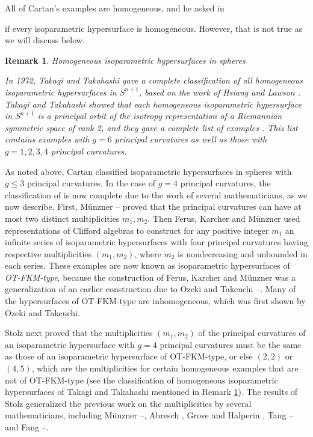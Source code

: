 \documentclass[12pt]{article}
\newtheorem{remark}{Remark}[section]
\begin{document}
All of Cartan's examples are homogeneous, and he asked in {\cite{Car3} if every isoparametric hypersurface
is homogeneous.  However,
that is not true as we will discuss below.

\begin{remark}{Homogeneous isoparametric hypersurfaces in spheres}
\label{rem-Takagi-Takahashi}

\noindent
{\rm In 1972, Takagi and Takahashi \cite{TT} gave a complete classification of all homogeneous
isoparametric hypersurfaces
in $S^{n+1}$, based on the work of Hsiang and Lawson \cite{HL}.  Takagi and Takahashi showed that each homogeneous
isoparametric hypersurface in $S^{n+1}$ is a principal orbit of the isotropy representation
of a Riemannian symmetric space of 
rank 2, and they gave a complete list of examples \cite[p. 480]{TT}.  This list contains examples with $g=6$
principal curvatures as well as those with $g=1,2,3,4$ principal curvatures. }
\end{remark} 

As noted above, Cartan classified isoparametric hypersurfaces in spheres with $g \leq 3$ principal curvatures.
In the case of $g=4$ principal curvatures, the classification of
is now complete due to the work of several 
mathematicians, as we now describe.  First,
M\"{u}nzner  \cite{Mu}--\cite{Mu2}  proved that
the principal curvatures can have at most two
distinct multiplicities $m_1,m_2$. 
Then Ferus, Karcher and M\"{u}nzner
\cite{FKM} 
used representations
of Clifford algebras to construct
for any positive integer
$m_1$ an infinite series of isoparametric hypersurfaces
with four principal curvatures having respective multiplicities
$(m_1,m_2)$, where $m_2$ is nondecreasing and
unbounded in each series. 
These examples are now known as isoparametric hypersurfaces of {\it OT-FKM-type}, because
the construction of Ferus, Karcher and M\"{u}nzner was a generalization of an earlier construction due to Ozeki and Takeuchi \cite{OT}--\cite{OT2}.  Many of the hypersurfaces of  OT-FKM-type are inhomogeneous, 
which was first shown by Ozeki and Takeuchi.

  
Stolz \cite{Stolz}  next proved that the multiplicities $(m_1,m_2)$
of the principal curvatures of an isoparametric
hypersurface with $g=4$ principal curvatures
must be the same as those of an isoparametric hypersurface of
OT-FKM-type, or else $(2,2)$ or $(4,5)$, which are the multiplicities for certain homogeneous examples
that are not of OT-FKM-type  (see the classification 
of homogeneous isoparametric hypersurfaces of Takagi and Takahashi \cite {TT} mentioned in 
Remark \ref{rem-Takagi-Takahashi}).  The results of Stolz generalized the previous work on the multiplicities by
several mathematicians, including M\"{u}nzner \cite{Mu}--\cite{Mu2},
Abresch \cite{Ab}, Grove and Halperin \cite{GH}, Tang \cite{Tang}--\cite{Tang2} and Fang
\cite{Fang3}--\cite{Fang2}.


}
\end{document}
